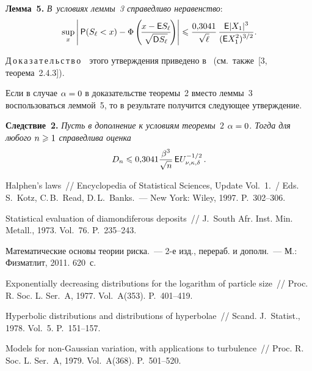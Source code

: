 \begin{multicols}{2}
\smallskip

\noindent
\textbf{Лемма~5.} \textit{В~условиях леммы~3 справедливо неравенство}:
$$
\sup\limits_x\left\vert\,{\sf P}(S_{\ell}<x)-\Phi\left(\!\displaystyle\frac{\displaystyle x-{\sf E}S_{\ell}\mathstrut}{\displaystyle \sqrt{{\sf D}S_{\ell}}\mathstrut}\!\right)\right\vert\leqslant\displaystyle\frac{\displaystyle 0{,}3041\mathstrut}{\displaystyle \sqrt{\ell}\mathstrut}\,
\displaystyle\frac{\displaystyle {\sf E}|X_1|^3\mathstrut}{\displaystyle ({\sf E}X_1^2)^{3/2}\mathstrut}.
$$

\smallskip

\noindent
Д\,о\,к\,а\,з\,а\,т\,е\,л\,ь\,с\,т\,в\,о\ \  этого утверждения приведено 
в~\cite{KorolevShevtsova2010} (см.\ также~[3, теорема~2.4.3]).

\smallskip

Если в случае $\alpha\hm=0$ в доказательстве теоремы~2 вместо леммы~3
воспользоваться леммой~5, то в результате получится следующее
утверждение.

\smallskip

\noindent
\textbf{Следствие~2.} \textit{Пусть в дополнение к условиям теоремы~$2$
$\alpha\hm=0$. Тогда для любого $n\hm\geqslant1$ справедлива оценка}
$$
D_n\leqslant0{,}3041\displaystyle\frac{\displaystyle \beta^3\mathstrut}{\displaystyle \sqrt{n}\mathstrut}\,{\sf E}U_{\nu,\kappa,\delta}^{-1/2}\,.
$$


{\small\frenchspacing
{%
\begin{thebibliography}{99}


 Halphen's laws~//
Encyclopedia of Statistical Sciences, Update Vol.~1.~/ 
Eds. S.~Kotz, C.\,B.~Read, D.\,L.~Banks.~---
New York: Wiley, 1997. P.~302--306.

 Statistical evaluation of diamondiferous deposits~// J.~South Afr. Inst. 
Min. Metall., 1973. Vol.~76. P.~235--243.

 Математические
основы теории риска.~--- 2-е изд., перераб. и дополн.~--- М.: Физматлит,
2011. 620~с.

 Exponentially decreasing distributions
for the logarithm of particle size~// Proc. R. Soc. L.
Ser.~A, 1977. Vol.~A(353). P.~401--419.

 Hyperbolic distributions and
distributions of hyperbolae~// Scand. J.~Statist., 1978. Vol.~5. P.~151--157.

 Models for non-Gaussian variation,
with applications to turbulence~// Proc. R. Soc. L. Ser.~A,
1979. Vol.~A(368). P.~501--520.


\end{thebibliography}}}
\end{multicols}
